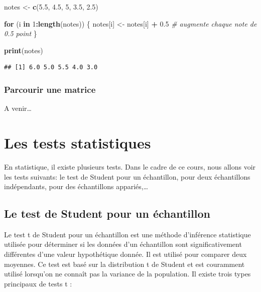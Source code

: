 \documentclass[
]{book}
\newenvironment{Shaded}{\begin{snugshade}}{\end{snugshade}}
\newcommand{\CommentTok}[1]{\textcolor[rgb]{0.56,0.35,0.01}{\textit{#1}}}
\newcommand{\ControlFlowTok}[1]{\textcolor[rgb]{0.13,0.29,0.53}{\textbf{#1}}}
\newcommand{\DecValTok}[1]{\textcolor[rgb]{0.00,0.00,0.81}{#1}}
\newcommand{\FloatTok}[1]{\textcolor[rgb]{0.00,0.00,0.81}{#1}}
\newcommand{\FunctionTok}[1]{\textcolor[rgb]{0.13,0.29,0.53}{\textbf{#1}}}
\newcommand{\NormalTok}[1]{#1}
\newcommand{\OtherTok}[1]{\textcolor[rgb]{0.56,0.35,0.01}{#1}}
\newcommand{\SpecialCharTok}[1]{\textcolor[rgb]{0.81,0.36,0.00}{\textbf{#1}}}
\begin{document}
\begin{Shaded}
\begin{Highlighting}[]
\NormalTok{notes }\OtherTok{\textless{}{-}} \FunctionTok{c}\NormalTok{(}\FloatTok{5.5}\NormalTok{, }\FloatTok{4.5}\NormalTok{, }\DecValTok{5}\NormalTok{, }\FloatTok{3.5}\NormalTok{, }\FloatTok{2.5}\NormalTok{)}

\ControlFlowTok{for}\NormalTok{ (i }\ControlFlowTok{in} \DecValTok{1}\SpecialCharTok{:}\FunctionTok{length}\NormalTok{(notes)) \{}
\NormalTok{  notes[i] }\OtherTok{\textless{}{-}}\NormalTok{ notes[i] }\SpecialCharTok{+} \FloatTok{0.5}  \CommentTok{\# augmente chaque note de 0.5 point}
\NormalTok{\}}

\FunctionTok{print}\NormalTok{(notes)}
\end{Highlighting}
\end{Shaded}

\begin{verbatim}
## [1] 6.0 5.0 5.5 4.0 3.0
\end{verbatim}

\subsection{Parcourir une matrice}\label{parcourir-une-matrice}

A venir\ldots{}

\chapter{Les tests statistiques}\label{les-tests-statistiques}

En statistique, il existe plusieurs tests. Dans le cadre de ce cours, nous allons voir les tests suivants: le test de Student pour un échantillon, pour deux échantillons indépendants, pour des échantillons appariés,\ldots{}

\section{Le test de Student pour un échantillon}\label{le-test-de-student-pour-un-uxe9chantillon}

Le test t de Student pour un échantillon est une méthode d'inférence statistique utilisée pour déterminer si les données d'un échantillon sont significativement différentes d'une valeur hypothétique donnée. Il est utilisé pour comparer deux moyennes. Ce test est basé sur la distribution t de Student et est couramment utilisé lorsqu'on ne connaît pas la variance de la population. Il existe trois types principaux de tests t :
\end{document}
